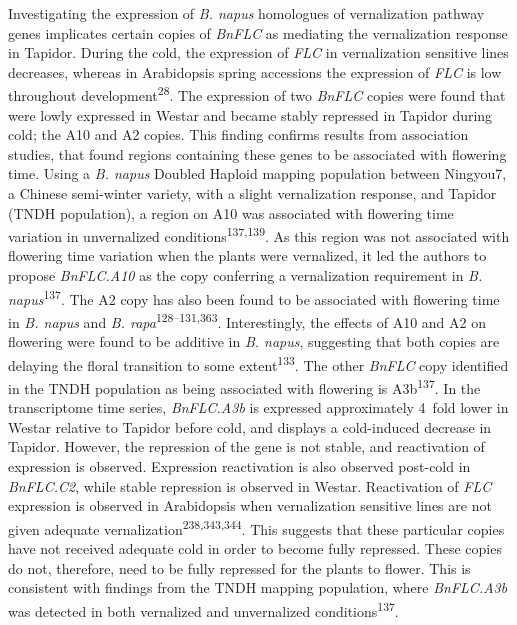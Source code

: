 \documentclass[12pt,]{book}
\begin{document}
Investigating the expression of \emph{B. napus} homologues of
vernalization pathway genes implicates certain copies of \emph{BnFLC} as
mediating the vernalization response in Tapidor. During the cold, the
expression of \emph{FLC} in vernalization sensitive lines decreases,
whereas in Arabidopsis spring accessions the expression of \emph{FLC} is
low throughout development\textsuperscript{28}. The expression of two
\emph{BnFLC} copies were found that were lowly expressed in Westar and
became stably repressed in Tapidor during cold; the A10 and A2 copies.
This finding confirms results from association studies, that found
regions containing these genes to be associated with flowering time.
Using a \emph{B. napus} Doubled Haploid mapping population between
Ningyou7, a Chinese semi-winter variety, with a slight vernalization
response, and Tapidor (TNDH population), a region on A10 was associated
with flowering time variation in unvernalized
conditions\textsuperscript{137,139}. As this region was not associated
with flowering time variation when the plants were vernalized, it led
the authors to propose \emph{BnFLC.A10} as the copy conferring a
vernalization requirement in \emph{B. napus}\textsuperscript{137}. The
A2 copy has also been found to be associated with flowering time in
\emph{B. napus} and \emph{B. rapa}\textsuperscript{128--131,363}.
Interestingly, the effects of A10 and A2 on flowering were found to be
additive in \emph{B. napus}, suggesting that both copies are delaying
the floral transition to some extent\textsuperscript{133}. The other
\emph{BnFLC} copy identified in the TNDH population as being associated
with flowering is A3b\textsuperscript{137}. In the transcriptome time
series, \emph{BnFLC.A3b} is expressed approximately 4~fold lower in
Westar relative to Tapidor before cold, and displays a cold-induced
decrease in Tapidor. However, the repression of the gene is not stable,
and reactivation of expression is observed. Expression reactivation is
also observed post-cold in \emph{BnFLC.C2}, while stable repression is
observed in Westar. Reactivation of \emph{FLC} expression is observed in
Arabidopsis when vernalization sensitive lines are not given adequate
vernalization\textsuperscript{238,343,344}. This suggests that these
particular copies have not received adequate cold in order to become
fully repressed. These copies do not, therefore, need to be fully
repressed for the plants to flower. This is consistent with findings
from the TNDH mapping population, where \emph{BnFLC.A3b} was detected in
both vernalized and unvernalized conditions\textsuperscript{137}.
\end{document}
